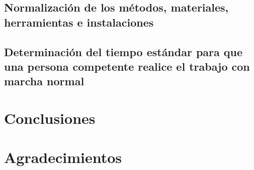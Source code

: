     \subsection{Normalización de los métodos, materiales, herramientas e instalaciones}
    
    \subsection{Determinación del tiempo estándar para que una persona competente realice el trabajo con marcha normal}
    
    
    
    
    
    
    
    \section{Conclusiones}
    
    
    
    \section{Agradecimientos}
    
    
    
    
    
    
    
    \appendix
    \label{Figura:instructivo}
    
    \label{Figura:Materiales}
    
    \label{Figura: DigBim}
    
    
    \label{Figura:TablasMTM}
    
    
    \newpage
    
    